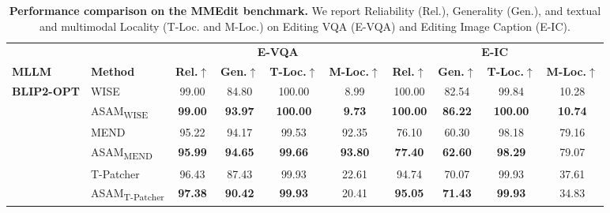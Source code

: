 \begin{table}[t]
\centering
\caption{\textbf{Performance comparison on the MMEdit benchmark.} We report Reliability (Rel.), Generality (Gen.), and textual and multimodal Locality (T-Loc. and M-Loc.) on Editing VQA (E-VQA) and Editing Image Caption (E-IC).}
\label{tab:pmrl_master}
\small
\setlength{\tabcolsep}{3pt}
\begin{tabular}{ll|cccc|cccc}
\toprule
& & \multicolumn{4}{c|}{\textbf{E-VQA}} & \multicolumn{4}{c}{\textbf{E-IC}} \\
\cmidrule(lr){3-6} \cmidrule(lr){7-10}
\textbf{MLLM} & \textbf{Method}
& \textbf{Rel.}$\uparrow$ & \textbf{Gen.}$\uparrow$ & \textbf{T-Loc.}$\uparrow$ & \textbf{M-Loc.}$\uparrow$
& \textbf{Rel.}$\uparrow$ & \textbf{Gen.}$\uparrow$ & \textbf{T-Loc.}$\uparrow$ & \textbf{M-Loc.}$\uparrow$ \\
\midrule
\multirow{8}{1.7cm}{\centering\textbf{BLIP2-OPT}} & WISE & 99.00 & 84.80 & 100.00 & 8.99 & 100.00 & 82.54 & 99.84 & 10.28 \\
&\cellcolor[rgb]{0.949,0.949,0.949} ASAM\textsubscript{WISE} &\cellcolor[rgb]{0.949,0.949,0.949} \textbf{99.00} &\cellcolor[rgb]{0.949,0.949,0.949} \textbf{93.97} &\cellcolor[rgb]{0.949,0.949,0.949} \textbf{100.00} &\cellcolor[rgb]{0.949,0.949,0.949} \textbf{9.73} &\cellcolor[rgb]{0.949,0.949,0.949} \textbf{100.00} &\cellcolor[rgb]{0.949,0.949,0.949} \textbf{86.22} &\cellcolor[rgb]{0.949,0.949,0.949} \textbf{100.00} &\cellcolor[rgb]{0.949,0.949,0.949} \textbf{10.74} \\
\cmidrule{2-10}
& MEND & 95.22 & 94.17 & 99.53 & 92.35 & 76.10 & 60.30 & 98.18 & 79.16 \\
&\cellcolor[rgb]{0.949,0.949,0.949} ASAM\textsubscript{MEND} &\cellcolor[rgb]{0.949,0.949,0.949} \textbf{95.99} &\cellcolor[rgb]{0.949,0.949,0.949} \textbf{94.65} &\cellcolor[rgb]{0.949,0.949,0.949} \textbf{99.66} &\cellcolor[rgb]{0.949,0.949,0.949} \textbf{93.80} &\cellcolor[rgb]{0.949,0.949,0.949} \textbf{77.40} &\cellcolor[rgb]{0.949,0.949,0.949} \textbf{62.60} &\cellcolor[rgb]{0.949,0.949,0.949} \textbf{98.29} &\cellcolor[rgb]{0.949,0.949,0.949} 79.07 \\
\cmidrule{2-10}
& T-Patcher & 96.43 & 87.43 & 99.93 & 22.61 & 94.74 & 70.07 & 99.93 & 37.61 \\
&\cellcolor[rgb]{0.949,0.949,0.949} ASAM\textsubscript{T-Patcher} &\cellcolor[rgb]{0.949,0.949,0.949} \textbf{97.38} &\cellcolor[rgb]{0.949,0.949,0.949} \textbf{90.42} &\cellcolor[rgb]{0.949,0.949,0.949} \textbf{99.93} &\cellcolor[rgb]{0.949,0.949,0.949} 20.41 &\cellcolor[rgb]{0.949,0.949,0.949} \textbf{95.05} &\cellcolor[rgb]{0.949,0.949,0.949} \textbf{71.43} &\cellcolor[rgb]{0.949,0.949,0.949} \textbf{99.93} &\cellcolor[rgb]{0.949,0.949,0.949} 34.83 \\

\end{tabular}
\end{table}
